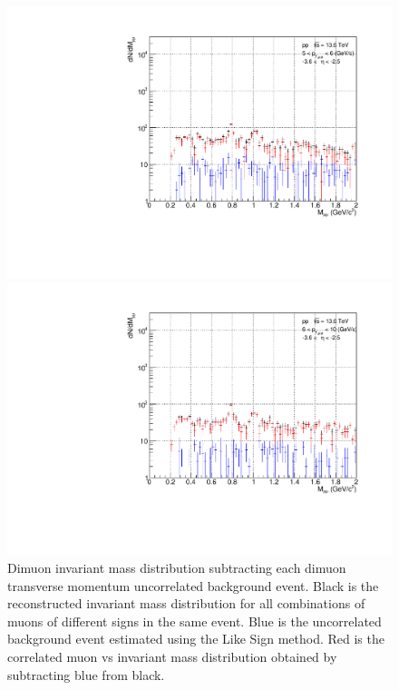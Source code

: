 \begin{figure}[H]
                    \\
                    \vspace{1em}
                    \begin{minipage}{0.45\textwidth}
                        \centering
                        \includegraphics[width=\textwidth]{fig/3_4_1_CB_pt_5to6.pdf}
                        \caption*{$5 < p_{T\mu\mu} < 6\ \mathrm{GeV}/c$}
                    \end{minipage}
                    \hfill
                    \begin{minipage}{0.45\textwidth}
                        \centering
                        \includegraphics[width=\textwidth]{fig/3_4_1_CB_pt_6to10.pdf}
                        \caption*{$6 < p_{T\mu\mu} < 10\ \mathrm{GeV/c}$}
                    \end{minipage}
                    \caption{Dimuon invariant mass distribution subtracting each dimuon transverse momentum uncorrelated background event. Black is the reconstructed invariant mass distribution for all combinations of muons of different signs in the same event. Blue is the uncorrelated background event estimated using the Like Sign method. Red is the correlated muon vs invariant mass distribution obtained by subtracting blue from black.}
                    \label{Analysis:Dimuon:CB:CB_pt_separation}
                \end{figure}
